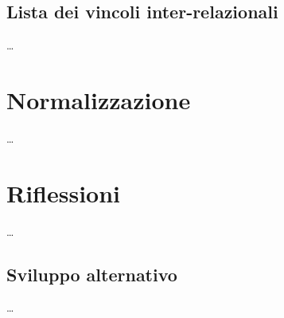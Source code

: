 \documentclass{article}
\begin{document}
\subsection{Lista dei vincoli inter-relazionali}
\large
\dots

\section{Normalizzazione}
\large
\dots

\section{Riflessioni}
\large
\dots

\subsection{Sviluppo alternativo}
\large
\dots
\end{document}
